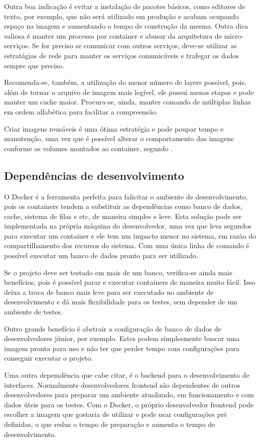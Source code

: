 \documentclass[
	12pt,				%
	openright,			%
	oneside,			%
	a4paper,			%
	chapter=TITLE,		%
	section=TITLE,		%
	english,			%
	french,				%
	spanish,			%
	brazil				%
	]{abntex2}
\begin{document}
Outra boa indicação é evitar a instalação de pacotes básicos, como editores de texto, por exemplo, que não será utilizado em produção e acabam ocupando espaço na imagem e aumentando o tempo de construção da mesma. Outra dica valiosa é manter um processo por container e abusar da arquitetura de micro-serviços. Se for preciso se comunicar com outros serviços, deve-se utilizar as estratágias de rede para manter os serviços comunicáveis e trafegar os dados sempre que preciso.

Recomenda-se, também, a utilização do menor número de layers possível, pois, além de tornar o arquivo de imagem mais legível, ele possui menos etapas e pode manter um cache maior. Procura-se, ainda, manter comando de múltiplas linhas em ordem alfabética para facilitar a compreensão.

Criar imagens reusáveis é uma ótima estratégia e pode poupar tempo e manutenção, uma vez que é possível alterar o comportamento das imagens conforme os volumes montados ao container, segundo .

\subsection{Dependências de desenvolvimento}

O Docker é a ferramenta perfeita para falicitar o ambiente de desenvolvimento, pois os containers tendem a substituir as dependências como banco de dados, cache, sistema de filas e etc, de maneira simples e leve. Esta solução pode ser implementada na própria máquina do desenvolvedor, uma vez que leva segundos para executar um container e ele tem um impacto menor no sistema, em razão do compartilhamento dos recursos do sistema. Com uma única linha de comando é possível executar um banco de dados pronto para ser utilizado.

Se o projeto deve ser testado em mais de um banco, verifica-se ainda mais benefícios, pois é possível parar e executar containers de maneira muito fácil. Isso deixa a troca de banco mais leve para ser executado no ambiente de desenvolvimento e dá mais flexibilidade para os testes, sem depender de um ambiente de testes.

Outro grande benefício é abstrair a configuração de banco de dados de desenvolvedores júnior, por exemplo. Estes podem simplesmente buscar uma imagem pronta para uso e não ter que perder tempo com configurações para conseguir executar o projeto.

Uma outra depemdência que cabe citar, é o backend para o desenvolvimento de interfaces. Normalmente desenvolvedores frontend são dependentes de outros desenvolvedores para preparar um ambiente atualizado, em funcionamento e com dados úteis para os testes. Com o Docker, o próprio desenvolvedor frontend pode escolher a imagem que gostaria de utilizar e pode usar configurações pré definidas, o que reduz o tempo de preparação e aumenta o tempo de desenvolvimento.
\end{document}
